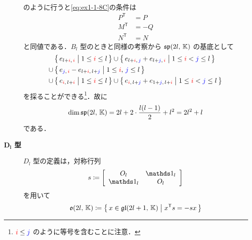 \documentclass{ltjsarticle}
\theoremstyle{mystyle} %
\numberwithin{equation}{section}
\begin{document}
\begin{description}
\begin{align}
    \end{align}
    のように行うと\eqref{eq:ex1-1-8C}の条件は
    \begin{align}
        P^{\mathsf{T}} &= P  \\
        M^{\mathsf{T}} &= -Q \\
        N^{\mathsf{T}} &= N
    \end{align}
    と同値である．$B_l$ 型のときと同様の考察から $\mathfrak{sp} (2l,\, \mathbb{K})$ の基底として
    \begin{align}
        &\bigl\{\, e_{l + \textcolor{red}{i},\, \textcolor{red}{i}} \bigm| 1 \le \textcolor{red}{i} \le l \,\bigr\} \cup \bigl\{\, e_{l + \textcolor{red}{i},\, \textcolor{blue}{j}} + e_{l + \textcolor{blue}{j},\, \textcolor{red}{i}} \bigm| 1 \le \textcolor{red}{i} < \textcolor{blue}{j} \le l \,\bigr\} \\
        \cup\, &\bigl\{\, e_{\textcolor{blue}{j},\, \textcolor{red}{i}} - e_{l + \textcolor{red}{i},\, l + \textcolor{blue}{j}} \bigm| 1 \le \textcolor{red}{i},\, \textcolor{blue}{j} \le l \,\bigr\}  \\
        \cup\, &\bigl\{\, e_{\textcolor{red}{i},\, l + \textcolor{red}{i}} \bigm| 1 \le \textcolor{red}{i} \le l \,\bigr\} \cup \bigl\{\, e_{\textcolor{red}{i},\, l + \textcolor{blue}{j}} + e_{1 + \textcolor{blue}{j},\, l + \textcolor{red}{i}} \bigm| 1 \le \textcolor{red}{i} < \textcolor{blue}{j} \le l \,\bigr\} 
    \end{align}
    を採ることができる\footnote{$\textcolor{red}{i} \le \textcolor{blue}{j}$ のように等号を含むことに注意．}．故に
    \begin{align}
        \dim \mathfrak{sp} (2l,\, \mathbb{K}) = 2l + 2 \cdot \frac{l (l-1)}{2} + l^2 = 2l^2 + l
    \end{align}
    である．
    \item[\textbf{$\bm{D_l}$ 型}] $D_l$ 型の定義は，対称行列
    \begin{align}
        s \coloneqq 
        \left[
            \begin{array}{cc}
                O_l &\unity_l \\ 
                \unity_l &O_l
            \end{array}
        \right]
    \end{align}
    を用いて
    \begin{align}
        \label{eq:ex1-1-8D}
        \mathfrak{o} (2l,\, \mathbb{K}) \coloneqq \bigl\{\, x \in \mathfrak{gl}(2l+1,\, \mathbb{K}) \bigm| x^{\mathsf{T}}s = -sx  \,\bigr\} 
    \end{align}

\end{description}
\end{document}
